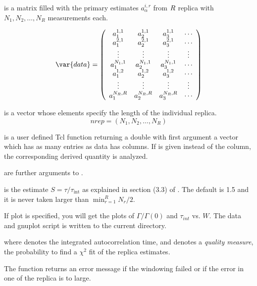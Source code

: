 \begin{arguments}
\item[\var{data}] is a matrix filled with the primary estimates
  $a_\alpha^{i,r}$ from $R\/$ replica with $N_1,N_2,\ldots,N_R$
  measurements each.

  \begin{displaymath}
    \var{data}=\left(
      \begin{array}
        {*{4}{c}} a_1^{1,1}&a_2^{1,1}&a_3^{1,1}&\cdots\\ 
        a_1^{2,1}&a_2^{2,1}&a_3^{2,1}&\cdots\\
        \vdots&\vdots&\vdots&\vdots\\
        a_1^{{N_1},1}&a_2^{{N_1},1}&a_3^{{N_1},1}&\cdots\\
        a_1^{1,2}&a_2^{1,2}&a_3^{1,2}&\cdots\\
        \vdots&\vdots&\vdots&\vdots\\
        a_1^{{N_R},R}&a_2^{{N_R},R}&a_3^{{N_R},R}&\cdots\\
      \end{array}
    \right)
  \end{displaymath}
\item[\var{nrep}] is a vector whose elements specify the length of the
  individual replica. 
  \begin{displaymath}
    nrep=\left(N_1,N_2,\ldots,N_R\right)
  \end{displaymath}
\item[\var{f}] is a user defined Tcl function returning a double with
  first argument a vector which has as many entries as data has
  columns. If  is given instead of the column, the
  corresponding derived quantity is analyzed.

\item[\var{f\_args}] are further arguments to .

\item[\var{s\_tau}] is the estimate $S=\tau/\tau_{\textrm{int}}$ as
  explained in section (3.3) of \cite{wolff04a}. The default is 1.5
  and it is never taken larger than $\min_{r=1}^R{N_r}/2$.

\item[\opt{plot}] If plot is specified, you will get the plots of
  $\Gamma/\Gamma(0)$ and $\tau_{int}$ vs. $W$.  The data and gnuplot
  script is written to the current directory.
\end{arguments}



\begin{code}
     
   
\end{code}

where  denotes the integrated autocorrelation time, and
 denotes a \emph{quality measure}, \ie the probability to find
a $\chi^2$ fit of the replica estimates.

The function returns an error message if the windowing failed or if
the error in one of the replica is to large.

